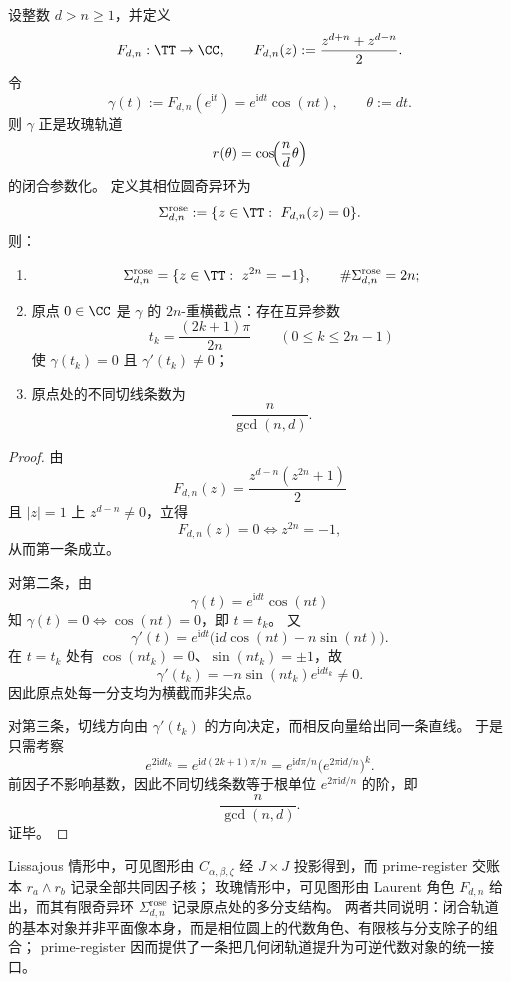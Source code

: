 \begin{theorem}\label{thm:cdim-rose-laurent-character-finite-singular-ring}
设整数 \(d>n\ge 1\)，并定义
\[
F_{d,n}:\TT\to\CC,\qquad
F_{d,n}(z):=\frac{z^{d+n}+z^{d-n}}{2}.
\]
令
\[
\gamma(t):=F_{d,n}(e^{\mathrm{i}t})=e^{\mathrm{i}dt}\cos(nt),
\qquad
\theta:=dt.
\]
则 \(\gamma\) 正是玫瑰轨道
\[
r(\theta)=\cos\!\Bigl(\frac{n}{d}\theta\Bigr)
\]
的闭合参数化。
定义其相位圆奇异环为
\[
\Sigma^{\mathrm{rose}}_{d,n}:=\{z\in\TT:\ F_{d,n}(z)=0\}.
\]
则：
\begin{enumerate}
  \item
  \[
  \Sigma^{\mathrm{rose}}_{d,n}=\{z\in\TT:\ z^{2n}=-1\},
  \qquad
  \#\Sigma^{\mathrm{rose}}_{d,n}=2n;
  \]
  \item 原点 \(0\in\CC\) 是 \(\gamma\) 的 \(2n\)-重横截点：存在互异参数
  \[
  t_k=\frac{(2k+1)\pi}{2n}\qquad(0\le k\le 2n-1)
  \]
  使 \(\gamma(t_k)=0\) 且 \(\gamma'(t_k)\neq 0\)；
  \item 原点处的不同切线条数为
  \[
  \frac{n}{\gcd(n,d)}.
  \]
\end{enumerate}
\end{theorem}
\begin{proof}
由
\[
F_{d,n}(z)=\frac{z^{d-n}(z^{2n}+1)}{2}
\]
且 \(|z|=1\) 上 \(z^{d-n}\neq 0\)，立得
\[
F_{d,n}(z)=0 \iff z^{2n}=-1,
\]
从而第一条成立。
\par
对第二条，由
\[
\gamma(t)=e^{\mathrm{i}dt}\cos(nt)
\]
知 \(\gamma(t)=0\iff \cos(nt)=0\)，即 \(t=t_k\)。
又
\[
\gamma'(t)=e^{\mathrm{i}dt}\bigl(\mathrm{i}d\cos(nt)-n\sin(nt)\bigr).
\]
在 \(t=t_k\) 处有 \(\cos(nt_k)=0\)、\(\sin(nt_k)=\pm1\)，故
\[
\gamma'(t_k)=-n\sin(nt_k)e^{\mathrm{i}dt_k}\neq 0.
\]
因此原点处每一分支均为横截而非尖点。
\par
对第三条，切线方向由 \(\gamma'(t_k)\) 的方向决定，而相反向量给出同一条直线。
于是只需考察
\[
e^{2\mathrm{i}dt_k}
=
e^{\mathrm{i}d(2k+1)\pi/n}
=
e^{\mathrm{i}d\pi/n}\bigl(e^{2\pi\mathrm{i}d/n}\bigr)^k.
\]
前因子不影响基数，因此不同切线条数等于根单位 \(e^{2\pi\mathrm{i}d/n}\) 的阶，即
\[
\frac{n}{\gcd(n,d)}.
\]
证毕。
\end{proof}

\begin{remark}[闭轨道的可逆提升范式]\label{rem:cdim-closed-trajectory-reversible-lift}
Lissajous 情形中，可见图形由 \(C_{\alpha,\beta,\zeta}\) 经 \(J\times J\) 投影得到，而 prime-register 交账本 \(r_a\wedge r_b\) 记录全部共同因子核；
玫瑰情形中，可见图形由 Laurent 角色 \(F_{d,n}\) 给出，而其有限奇异环 \(\Sigma^{\mathrm{rose}}_{d,n}\) 记录原点处的多分支结构。
两者共同说明：闭合轨道的基本对象并非平面像本身，而是相位圆上的代数角色、有限核与分支除子的组合；
prime-register 因而提供了一条把几何闭轨道提升为可逆代数对象的统一接口。
\end{remark}

\endinput
